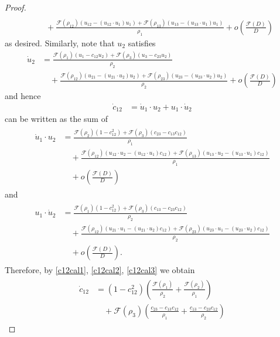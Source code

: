 \documentclass[reqno]{amsart}
\theoremstyle{plain}
\theoremstyle{definition}
\numberwithin{equation}{section}
\newcommand{\1}{\mathbbm{1}}
\begin{document}
\begin{proof}
\begin{align*}
\\
&\quad+\frac{\mathcal{F}(\rho_{12})(u_{12}-(u_{12}\cdot u_1)u_1)+\mathcal{F}(\rho_{13})(u_{13}-(u_{13}\cdot u_1)u_1)}{\rho_1}+o\left(\frac{\mathcal{F}(D)}{D}\right)
\end{align*}
as desired. Similarly, note that $u_2$ satisfies
\begin{align*}
\dot{u}_2&=\frac{\mathcal{F}(\rho_1)(u_1-c_{12}u_2)+\mathcal{F}(\rho_3)(u_3-c_{23}u_2)}{\rho_2}
\\
&\quad+\frac{\mathcal{F}(\rho_{12})(u_{21}-(u_{21}\cdot u_2)u_2)+\mathcal{F}(\rho_{23})(u_{23}-(u_{23}\cdot u_2)u_2)}{\rho_2}+o\left(\frac{\mathcal{F}(D)}{D}\right)
\end{align*}
and hence
\begin{align}\label{c12cal1}
\dot{c}_{12}&=\dot{u}_1\cdot u_2+u_1\cdot \dot{u}_2
\end{align}
can be written as the sum of
\begin{align}\label{c12cal2}
\begin{aligned}
\dot{u}_1\cdot u_2&=\frac{\mathcal{F}(\rho_2)(1-c_{12}^2)+\mathcal{F}(\rho_3)(c_{23}-c_{13}c_{12})}{\rho_1}
\\
&\quad+\frac{\mathcal{F}(\rho_{12})(u_{12}\cdot u_2-(u_{12}\cdot u_1)c_{12})+\mathcal{F}(\rho_{13})(u_{13}\cdot u_2-(u_{13}\cdot u_1)c_{12})}{\rho_1}
\\
&\quad+o\left(\frac{\mathcal{F}(D)}{D}\right)
\end{aligned}
\end{align}
and
\begin{align}\label{c12cal3}
\begin{aligned}
u_1\cdot \dot{u}_2&=\frac{\mathcal{F}(\rho_1)(1-c_{12}^2)+\mathcal{F}(\rho_3)(c_{13}-c_{23}c_{12})}{\rho_2}
\\
&\quad+\frac{ \mathcal{F}(\rho_{12})(u_{21}\cdot u_1-(u_{21}\cdot u_2)c_{12})+\mathcal{F}(\rho_{23})(u_{23}\cdot u_1-(u_{23}\cdot u_2)c_{12})}{\rho_2}
\\
&\quad+o\left(\frac{\mathcal{F}(D)}{D}\right).
\end{aligned}
\end{align}
Therefore, by \eqref{c12cal1}, \eqref{c12cal2}, \eqref{c12cal3} we obtain
\begin{align}\label{c12cal4}
\begin{aligned}
\dot{c}_{12}&=(1-c_{12}^2)\left(\frac{\mathcal{F}(\rho_1)}{\rho_2}+\frac{\mathcal{F}(\rho_2)}{\rho_1}\right)
\\
&\quad+\mathcal{F}(\rho_3)\left(\frac{c_{23}-c_{13}c_{12}}{\rho_1}+\frac{c_{13}-c_{23}c_{12}}{\rho_2} \right)

\end{aligned}
\end{align}
\end{proof}
\end{document}
